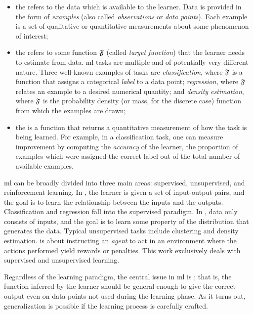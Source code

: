 \begin{itemize}
    \item the  refers to the data which is available to the learner. Data is provided in the form of \emph{examples} (also called \emph{observations} or \emph{data points}). Each example is a set of qualitative or quantitative measurements about some phenomenon of interest;
    \item the  refers to some function $\mathfrak{F}$ (called \emph{target function}) that the learner needs to estimate from data. \gls{ml} tasks are multiple and of potentially very different nature. Three well-known examples of tasks are \emph{classification}, where $\mathfrak{F}$ is a function that assigns a categorical \emph{label} to a data point; \emph{regression}, where $\mathfrak{F}$ relates an example to a desired numerical quantity; and \emph{density estimation}, where $\mathfrak{F}$ is the probability density (or mass, for the discrete case) function from which the examples are drawn;
    \item the  is a function that returns a quantitative measurement of how  the task is being learned. For example, in a classification task, one can measure improvement by computing the \emph{accuracy} of the learner, \ie the proportion of examples which were assigned the correct label out of the total number of available examples.
\end{itemize}

\gls{ml} can be broadly divided into three main areas: supervised, unsupervised, and reinforcement learning. In , the learner is given a set of input-output pairs, and the goal is to learn the relationship between the inputs and the outputs. Classification and regression fall into the supervised paradigm. In , data only consists of inputs, and the goal is to learn some property of the distribution that generates the data. Typical unsupervised tasks include clustering and density estimation.  \citep{sutton1998rl} is about instructing an \emph{agent} to act in an environment where the actions performed yield rewards or penalties. This work exclusively deals with supervised and unsupervised learning.

Regardless of the learning paradigm, the central issue in \gls{ml} is ; that is, the function inferred by the learner should be general enough to give the correct output even on data points not used during the learning phase. As it turns out, generalization is possible if the learning process is carefully crafted.

